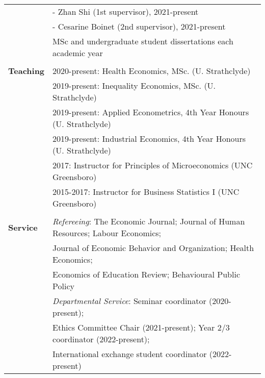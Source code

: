\documentclass[11pt,a4paper]{article}
\begin{document}
\begin{longtable}{l l}
																												&  \hspace{0.05cm} - Zhan Shi (1st supervisor), 2021-present  \\
																												&  \hspace{0.05cm} - Cesarine Boinet (2nd supervisor), 2021-present  \\
\addlinespace																												
																												& MSc and undergraduate student dissertations each academic year  \\			
																												&  \\
\textbf{Teaching}													&  2020-present: Health Economics, MSc. (U. Strathclyde)  \\  															
																												&  2019-present: Inequality Economics, MSc. (U. Strathclyde)	   \\
																												&  2019-present: Applied Econometrics, 4th Year Honours (U. Strathclyde)  \\
																												&  2019-present: Industrial Economics, 4th Year Honours (U. Strathclyde)  \\
																												&  2017: Instructor for Principles of Microeconomics  (UNC Greensboro)  \\
																												&  2015-2017: Instructor for Business Statistics I  (UNC Greensboro)   \\
																												&  \\
\textbf{Service}							 								&  \textit{Refereeing}: The Economic Journal; Journal of Human Resources; Labour Economics;  \\ 
																												& Journal of Economic Behavior and Organization; Health Economics;   \\
																												& Economics of Education Review; Behavioural Public Policy  \\
\addlinespace
																												&  \textit{Departmental Service}: Seminar coordinator (2020-present);  \\
																												&  Ethics Committee Chair (2021-present); Year 2/3 coordinator (2022-present);  \\ 	
																												& 	 International exchange student coordinator (2022-present)  \\																				
\end{longtable}

\end{document}
